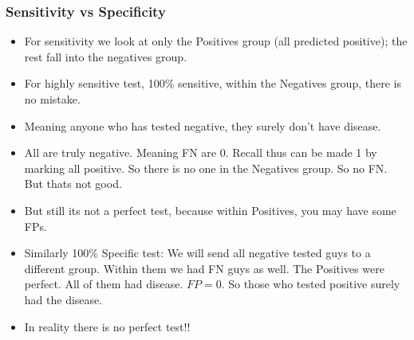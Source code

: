 \begin{frame}[fragile]\frametitle{Sensitivity vs Specificity}

	\begin{itemize}
	\item For sensitivity we look at only the Positives group (all predicted positive); the rest fall into the negatives group.
	\item For highly sensitive test, 100\% sensitive, within the Negatives group, there is no mistake. 
	\item Meaning anyone who has tested negative, they surely don't have disease.
	\item All are truly negative. Meaning FN are 0. Recall thus can be made 1 by marking all positive. So there is no one in the Negatives group. So no FN. But thats not good.
	\item But still its not a perfect test, because within Positives, you may have some FPs.
	\item Similarly 100\% Specific test: We will send all negative tested guys to a different group. Within them we had FN guys as well. The Positives were perfect. All of them had disease. $FP=0$. So those who tested positive surely had the disease.
	\item In reality there is no perfect test!!
	\end{itemize}

\end{frame}


	
	
